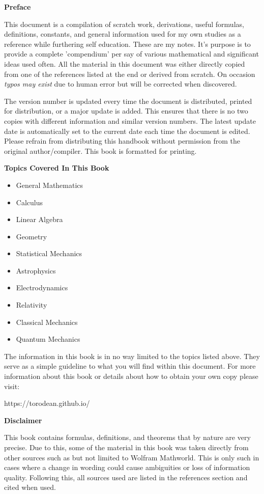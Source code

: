 \begin{center}
	\textbf{Preface}
\end{center}

This document is a compilation of scratch work, derivations, useful formulas, definitions, constants, and general information used for my own studies as a reference while furthering self education. These are my notes. It's purpose is to provide a complete 'compendium' per say of various mathematical and significant ideas used often. All the material in this document was either directly copied from one of the references listed at the end or derived from scratch. On occasion \textit{typos may exist} due to human error but will be corrected when discovered.
	
The version number is updated every time the document is distributed, printed for distribution, or a major update is added. This ensures that there is no two copies with different information and similar version numbers. The latest update date is automatically set to the current date each time the document is edited. Please refrain from distributing this handbook without permission from the original author/compiler. This book is formatted for printing.

\begin{center}
	\textbf{Topics Covered In This Book}
\end{center}

\begin{multicols}{2}
\begin{itemize}
	\item General Mathematics
	\item Calculus
	\item Linear Algebra
	\item Geometry
	\item Statistical Mechanics
	\item Astrophysics
	\item Electrodynamics
	\item Relativity
	\item Classical Mechanics
	\item Quantum Mechanics
\end{itemize} 
\end{multicols}

The information in this book is in no way limited to the topics listed above. They serve as a simple guideline to what you will find within this document. For more information about this book or details about how to obtain your own copy please visit:
\begin{center}
	https://torodean.github.io/
\end{center}
\begin{center}
	\textbf{Disclaimer}
\end{center}

This book contains formulas, definitions, and theorems that by nature are very precise. Due to this, some of the material in this book was taken directly from other sources such as but not limited to Wolfram Mathworld. This is only such in cases where a change in wording could cause ambiguities or loss of information quality.  Following this, all sources used are listed in the references section and cited when used.